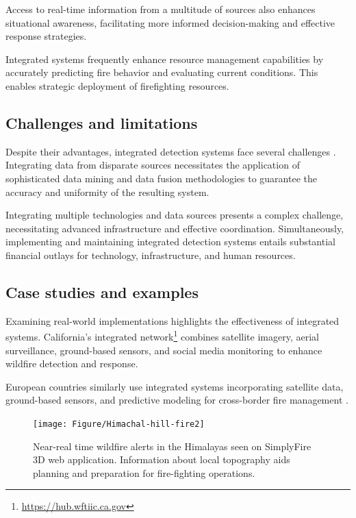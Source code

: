 \documentclass[
  12 pt,
]{Nemilov}
\begin{document}
Access to real-time information from a multitude of sources also enhances situational awareness, facilitating more informed decision-making and effective response strategies.

Integrated systems frequently enhance resource management capabilities by accurately predicting fire behavior and evaluating current conditions. This enables strategic deployment of firefighting resources.

\subsection{Challenges and limitations}\label{challenges-and-limitations-4}

Despite their advantages, integrated detection systems face several challenges \citep{ambrosia1998integration, lourencco2021integrated}. Integrating data from disparate sources necessitates the application of sophisticated data mining and data fusion methodologies to guarantee the accuracy and uniformity of the resulting system.

Integrating multiple technologies and data sources presents a complex challenge, necessitating advanced infrastructure and effective coordination. Simultaneously, implementing and maintaining integrated detection systems entails substantial financial outlays for technology, infrastructure, and human resources.

\subsection{Case studies and examples}\label{case-studies-and-examples}

Examining real-world implementations highlights the effectiveness of integrated systems. California's integrated network\footnote{\url{https://hub.wftiic.ca.gov}} combines satellite imagery, aerial surveillance, ground-based sensors, and social media monitoring to enhance wildfire detection and response.

European countries similarly use integrated systems incorporating satellite data, ground-based sensors, and predictive modeling for cross-border fire management \citep{kutchartt2023fire}.

\begin{figure}

{\centering \texttt{[image: Figure/Himachal-hill-fire2]} 

}

\caption{Near-real time wildfire alerts in the Himalayas seen on SimplyFire 3D web application. Information about local topography aids planning and preparation for fire-fighting operations.}\label{fig:SimplyFire3d}
\end{figure}
\end{document}
